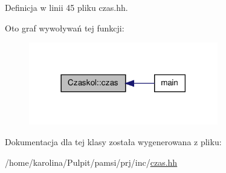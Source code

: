 Definicja w linii 45 pliku czas.\-hh.



Oto graf wywoływań tej funkcji\-:\nopagebreak
\begin{figure}[H]
\begin{center}
\leavevmode
\includegraphics[width=234pt]{class_czaskol_a0ce6e7012a511af4c9c0012bfdec2fbc_icgraph}
\end{center}
\end{figure}




Dokumentacja dla tej klasy została wygenerowana z pliku\-:\begin{DoxyCompactItemize}
\item 
/home/karolina/\-Pulpit/pamsi/prj/inc/\hyperlink{czas_8hh}{czas.\-hh}\end{DoxyCompactItemize}
